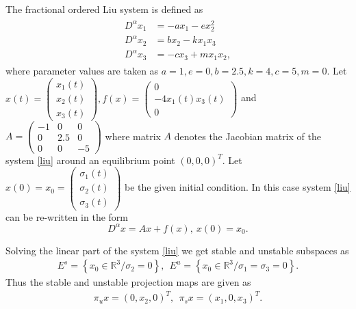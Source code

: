 \begin{exmp}
	The fractional ordered Liu system is defined as
	\begin{align}
	\begin{split} \label{liu}
	D^{\alpha}x_1 &= -a x_1 - e x_2^2 \\
	D^{\alpha}x_2 &= b x_2 - k x_1 x_3 \\
	D^{\alpha}x_3 &= -c x_3 + m x_1 x_2, 
	\end{split}
	\end{align}
	where parameter values are taken as $a=1, e=0, b=2.5, k=4, c=5, m=0$. Let $x(t) = \begin{pmatrix}
	x_1(t) \\ x_2(t) \\ x_3(t) 
	\end{pmatrix}, f(x) =  \begin{pmatrix}
	0 \\ -4 x_1(t) x_3(t) \\ 0 
	\end{pmatrix}$ and $A = \begin{pmatrix}
	-1 & 0 & 0 \\ 0 & 2.5 & 0 \\ 0 & 0 & -5 
	\end{pmatrix}$ where matrix $A$ denotes the Jacobian matrix of the system \eqref{liu} around an equilibrium point $(0,0,0)^T$. Let $ x(0) =x_0= \begin{pmatrix}
	\sigma_1(t) \\ \sigma_2(t) \\ \sigma_3(t) 
	\end{pmatrix}$ be the given initial condition. In this case system \eqref{liu} can be re-written in the form
	\begin{equation}
	D^{\alpha} x = A x + f(x), ~x(0) = x_0.
	\end{equation} 
	
	Solving the linear part of the system \eqref{liu} we get stable and unstable subspaces as
	\begin{align}
	E^s = \left\lbrace x_0 \in \mathbb{R}^3 \bigg/ \sigma_2 = 0\right\rbrace, ~~ E^u = \left\lbrace x_0 \in \mathbb{R}^3 \bigg/ \sigma_1 = \sigma_3 = 0 \right\rbrace.
	\end{align}
	Thus the stable and unstable projection maps are given as 
	\begin{align}
	\pi_u x = (0, x_2, 0)^T, ~~	\pi_s x = (x_1, 0, x_3)^T.
	\end{align}
	

\end{exmp}
